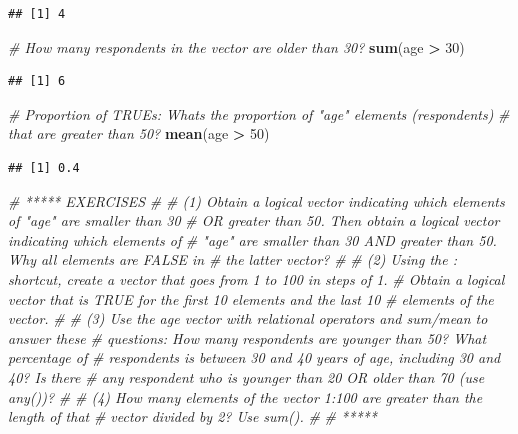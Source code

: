 \documentclass[
]{book}
\newenvironment{Shaded}{\begin{snugshade}}{\end{snugshade}}
\newcommand{\CommentTok}[1]{\textcolor[rgb]{0.56,0.35,0.01}{\textit{#1}}}
\newcommand{\DecValTok}[1]{\textcolor[rgb]{0.00,0.00,0.81}{#1}}
\newcommand{\FunctionTok}[1]{\textcolor[rgb]{0.13,0.29,0.53}{\textbf{#1}}}
\newcommand{\NormalTok}[1]{#1}
\newcommand{\SpecialCharTok}[1]{\textcolor[rgb]{0.81,0.36,0.00}{\textbf{#1}}}
\begin{document}
\begin{verbatim}
## [1] 4
\end{verbatim}

\begin{Shaded}
\begin{Highlighting}[]
\CommentTok{\# How many respondents in the vector are older than 30?}
\FunctionTok{sum}\NormalTok{(age }\SpecialCharTok{\textgreater{}} \DecValTok{30}\NormalTok{)}
\end{Highlighting}
\end{Shaded}

\begin{verbatim}
## [1] 6
\end{verbatim}

\begin{Shaded}
\begin{Highlighting}[]
\CommentTok{\# Proportion of TRUE\textquotesingle{}s: What\textquotesingle{}s the proportion of "age" elements (respondents)}
\CommentTok{\# that are greater than 50?}
\FunctionTok{mean}\NormalTok{(age }\SpecialCharTok{\textgreater{}} \DecValTok{50}\NormalTok{)}
\end{Highlighting}
\end{Shaded}

\begin{verbatim}
## [1] 0.4
\end{verbatim}

\begin{Shaded}
\begin{Highlighting}[]
\CommentTok{\# ***** EXERCISES}
\CommentTok{\#}
\CommentTok{\# (1) Obtain a logical vector indicating which elements of "age" are smaller than 30}
\CommentTok{\# OR greater than 50. Then obtain a logical vector indicating which elements of}
\CommentTok{\# "age" are smaller than 30 AND greater than 50. Why all elements are FALSE in}
\CommentTok{\# the latter vector?}
\CommentTok{\#}
\CommentTok{\# (2) Using the : shortcut, create a vector that goes from 1 to 100 in steps of 1.}
\CommentTok{\# Obtain a logical vector that is TRUE for the first 10 elements and the last 10}
\CommentTok{\# elements of the vector.}
\CommentTok{\#}
\CommentTok{\# (3) Use the age vector with relational operators and sum/mean to answer these}
\CommentTok{\# questions: How many respondents are younger than 50? What percentage of}
\CommentTok{\# respondents is between 30 and 40 years of age, including 30 and 40? Is there}
\CommentTok{\# any respondent who is younger than 20 OR older than 70 (use any())?}
\CommentTok{\#}
\CommentTok{\# (4) How many elements of the vector 1:100 are greater than the length of that }
\CommentTok{\# vector divided by 2? Use sum().}
\CommentTok{\#}
\CommentTok{\# *****}
\end{Highlighting}
\end{Shaded}
\end{document}

